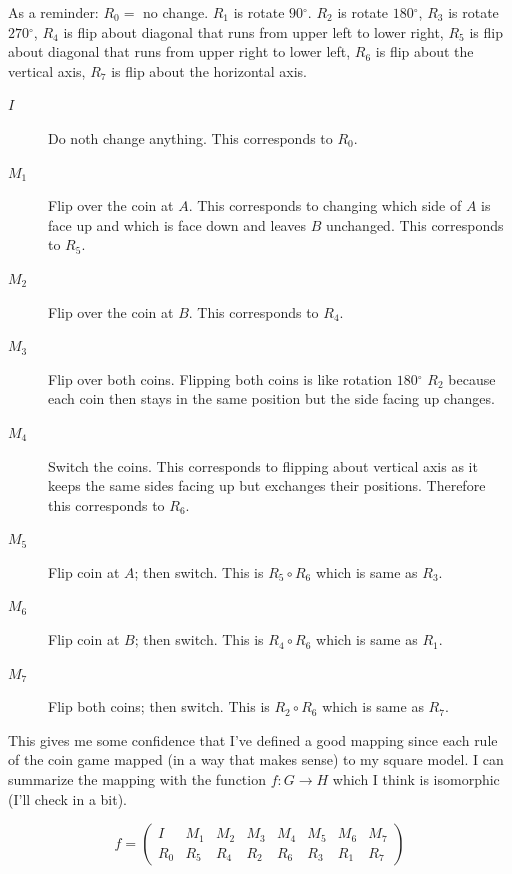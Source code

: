 \documentclass[twoside]{amsart}
\newcommand{\blank}{\vspace{5pt}}
\newcommand{\degree}{\ensuremath{^\circ}}
\begin{document}
\begin{enumerate}[A.]
\begin{enumerate}[1]
      As a reminder: $R_0 = $ no change. $R_1$ is rotate $90\degree$.
      $R_2$ is rotate $180\degree$, $R_3$ is rotate $270\degree$,
      $R_4$ is flip about diagonal that runs from upper left to lower right,
      $R_5$ is flip about diagonal that runs from upper right to lower left,
      $R_6$ is flip about the vertical axis, $R_7$ is flip about the horizontal
      axis.

      \begin{description}
         \item[$I$] Do noth change anything. This corresponds to $R_0$.
         \item[$M_1$] Flip over the coin at $A$. This corresponds to changing
         which side of $A$ is face up and which is face down and leaves $B$
         unchanged. This corresponds to $R_5$.
         \item[$M_2$] Flip over the coin at $B$. This corresponds to
         $R_4$.
         \item[$M_3$] Flip over both coins. Flipping both coins is like 
         rotation $180\degree$ $R_2$ because
         each coin then stays in the same position but the side facing up
         changes.
         \item[$M_4$] Switch the coins. This corresponds to flipping about
         vertical axis as it keeps the same sides facing up but exchanges
         their positions. Therefore this corresponds to $R_6$.
         \item[$M_5$] Flip coin at $A$; then switch. This is $R_5 \circ R_6$
         which is same as $R_3$.
         \item[$M_6$] Flip coin at $B$; then switch. This is $R_4 \circ R_6$
         which is same as $R_1$.
         \item[$M_7$] Flip both coins; then switch. This is $R_2 \circ R_6$
         which is same as $R_7$.
      \end{description}

      This gives me some confidence that I've defined a good mapping since
      each rule of the coin game mapped (in a way that makes sense) to my
      square model. I can summarize the mapping with the function 
      $f : G \to H$ which I think is isomorphic (I'll check in a bit).

      \blank
      \begin{center}
      \[
         f =
         \begin{pmatrix}
            I   & M_1 & M_2 & M_3 & M_4 & M_5 & M_6 & M_7 \\
            R_0 & R_5 & R_4 & R_2 & R_6 & R_3 & R_1 & R_7
         \end{pmatrix}
      \]
      \end{center}
      \blank


\end{enumerate}
\end{enumerate}
\end{document}
